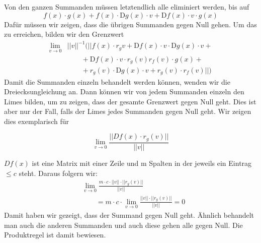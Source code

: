 Von den ganzen Summanden müssen letztendlich alle eliminiert werden, bis auf 
\begin{equation*} f(x) \cdot g(x) + f(x) \cdot \text{D}g(x) \cdot v + \text{D}f(x) \cdot v \cdot g(x) \end{equation*} 
Dafür müssen wir zeigen, dass die übrigen Summanden gegen Null gehen. Um das zu erreichen, bilden wir den Grenzwert
\begin{align*}
\lim \limits_{v \rightarrow 0} &||v||^{-1}(||f(x) \cdot r_{g}v + \text{D}f(x) \cdot v \cdot \text{D}g(x) \cdot v +{}\\
&\qquad + \text{D}f(x) \cdot v \cdot r_{g}(v) r_{f}(v) \cdot g(x) +{}\\
&\qquad + r_{g}(v) \cdot \text{D}g(x) \cdot v + r_{g}(v) \cdot r_{f}(v)||)
\end{align*}
Damit die Summanden einzeln behandelt werden können, wenden wir die Dreiecksungleichung an. Dann können wir von jedem Summanden einzeln den Limes bilden, um zu zeigen, dass der gesamte Grenzwert gegen Null geht. Dies ist aber nur der Fall, falls der Limes jedes Summanden gegen Null geht. Wir zeigen dies exemplarisch für 

\begin{equation*}
\lim\limits_{v \rightarrow 0} \frac{||Df(x) \cdot r_{g}(v)||}{||v||}
\end{equation*}

$Df(x)$ ist eine Matrix mit einer Zeile und m Spalten in der jeweils ein Eintrag $\leq c$ steht. Daraus folgern wir:
\begin{align*}
&\lim\limits_{v \rightarrow 0} \frac{m \cdot c \cdot ||v|| \cdot ||r_{g}(v)||}{||v||}\\
&\qquad= m \cdot c \cdot \lim\limits_{v \rightarrow 0} \frac{ ||v|| \cdot ||r_{g}(v)||}{||v||} = 0
\end{align*} 
Damit haben wir gezeigt, dass der Summand gegen Null geht. Ähnlich behandelt man auch die anderen Summanden und auch diese gehen alle gegen Null.
Die Produktregel ist damit bewiesen. 














